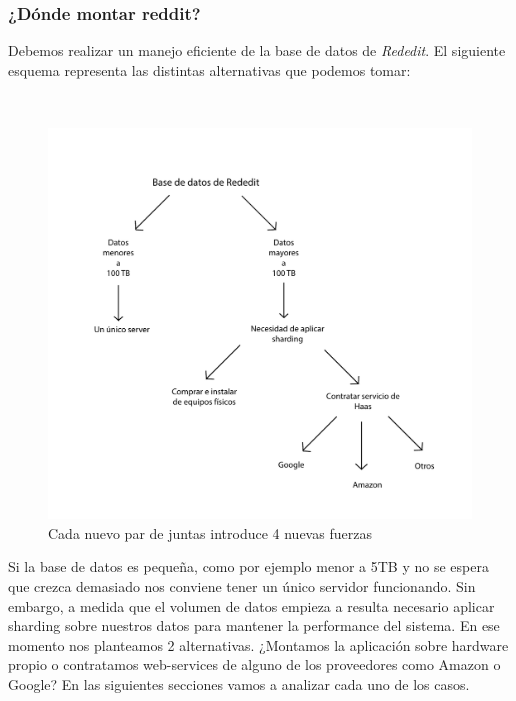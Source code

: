 

\subsubsection{¿Dónde montar reddit?}

Debemos realizar un manejo eficiente de la base de datos de \emph{Rededit}. El siguiente esquema representa las distintas
alternativas que podemos tomar:

~

\begin{figure}[!h]
	\begin{center}
		  \includegraphics[keepaspectratio]{imagenes/im_1.pdf}
		  \caption{Cada nuevo par de juntas introduce 4 nuevas fuerzas}
		  \label{fig:contra1}
	\end{center}
\end{figure}
\FloatBarrier

Si la base de datos es peque\~na, como por ejemplo menor a 5TB y no se espera que crezca demasiado
nos conviene tener un único servidor funcionando. Sin embargo, a medida que el volumen de datos
empieza a resulta necesario aplicar sharding sobre nuestros datos para mantener la performance del sistema. En ese
momento nos planteamos 2 alternativas. ¿Montamos la aplicación sobre hardware propio o contratamos web-services 
de alguno de los proveedores como Amazon o Google? En las siguientes secciones vamos a analizar cada uno de los casos.


